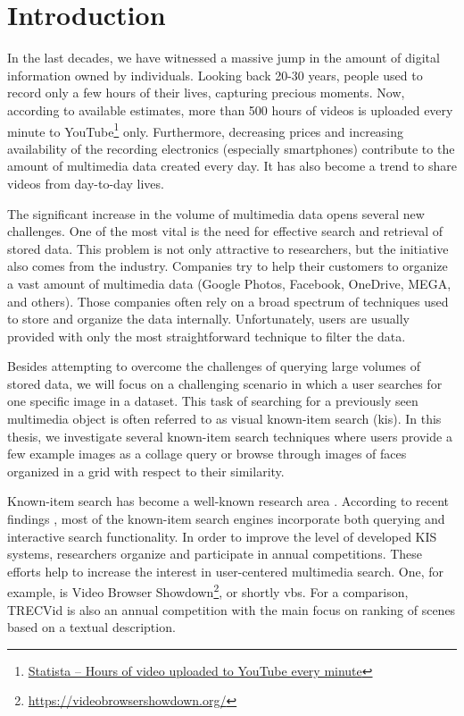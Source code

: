 \chapter*{Introduction}

In the last decades, we have witnessed a massive jump in the amount of digital information owned by individuals. Looking back 20-30 years, people used to record only a few hours of their lives, capturing precious moments. Now, according to available estimates, more than 500 hours of videos is uploaded every minute  to YouTube\footnote{\href{https://www.statista.com/statistics/259477/hours-of-video-uploaded-to-youtube-every-minute/}{Statista -- Hours of video uploaded to YouTube every minute}} only. Furthermore, decreasing prices and increasing availability of the recording electronics (especially smartphones) contribute to the amount of multimedia data created every day. It has also become a trend to share videos from day-to-day lives.

The significant increase in the volume of multimedia data opens several new challenges. One of the most vital is the need for effective search and retrieval of stored data. This problem is not only attractive to researchers, but the initiative also comes from the industry. Companies try to help their customers to organize a vast amount of multimedia data (Google Photos, Facebook, OneDrive, MEGA, and others). Those companies often rely on a broad spectrum of techniques used to store and organize the data internally. Unfortunately, users are usually provided with only the most straightforward technique to filter the data.

Besides attempting to overcome the challenges of querying large volumes of stored data, we will focus on a challenging scenario in which a user searches for one specific image in a dataset. This task of searching for a previously seen multimedia object is often referred to as visual known-item search (\acrshort{kis}). In this thesis, we investigate several known-item search techniques where users provide a few example images as a collage query or browse through images of faces organized in a grid with respect to their similarity.

Known-item search has become a well-known research area \citep{8352047}. According to recent findings \citep{9037125}, most of the known-item search engines incorporate both querying and interactive search functionality. In order to improve the level of developed KIS systems, researchers organize and participate in annual competitions. These efforts help to increase the interest in user-centered multimedia search. One, for example, is Video Browser Showdown\footnote{\url{https://videobrowsershowdown.org/}}, or shortly \acrshort{vbs}. For a comparison, TRECVid \citep{2019trecvidawad} is also an annual competition with the main focus on ranking of scenes based on a textual description.

